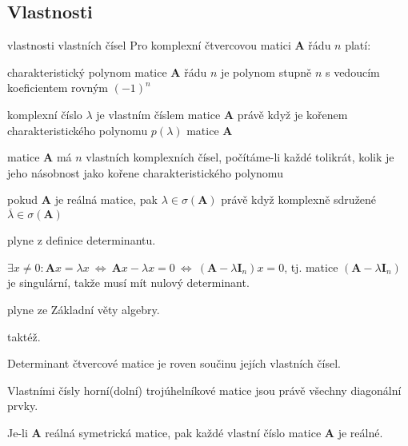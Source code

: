 \subsection{Vlastnosti}

\begin{vetaN}{vlastnosti vlastních čísel}
Pro komplexní čtvercovou matici \textbf{A} řádu $n$ platí:
\begin{penumerate}
  \item charakteristický polynom matice \textbf{A} řádu $n$ je polynom stupně $n$ s vedoucím koeficientem rovným $(-1)^n$
  \item komplexní číslo $\lambda$ je vlastním číslem matice \textbf{A} právě když je kořenem charakteristického polynomu $p(\lambda)$ matice \textbf{A}
  \item matice \textbf{A} má $n$ vlastních komplexních čísel, počítáme-li každé tolikrát, kolik je jeho násobnost jako kořene charakteristického polynomu
  \item pokud \textbf{A} je reálná matice, pak $\lambda \in \sigma(\textbf{A})$ právě když komplexně sdružené $\overline{\lambda} \in \sigma(\textbf{A})$
\end{penumerate}

\medskip
\begin{dukaz}
\begin{penumerate}
    \item plyne z definice determinantu.
    \item $\exists x\neq 0: \mathbf{A}x=\lambda x\ \Leftrightarrow\ \mathbf{A}x-\lambda x=0\ \Leftrightarrow\ (\mathbf{A}-\lambda \textbf{I}_n)x=0$, tj. matice $(\mathbf{A}-\lambda \textbf{I}_n)$ je singulární, takže musí mít nulový determinant.
    \item plyne ze Základní věty algebry.
    \item taktéž.
\end{penumerate}
\end{dukaz}
\end{vetaN}

\begin{veta}
Determinant čtvercové matice je roven součinu jejích vlastních čísel.
\end{veta}

\begin{veta}
Vlastními čísly horní(dolní) trojúhelníkové matice jsou právě všechny diagonální prvky.
\end{veta}

\begin{veta}
Je-li \textbf{A} reálná symetrická matice, pak každé vlastní číslo matice \textbf{A} je reálné.
\end{veta}

